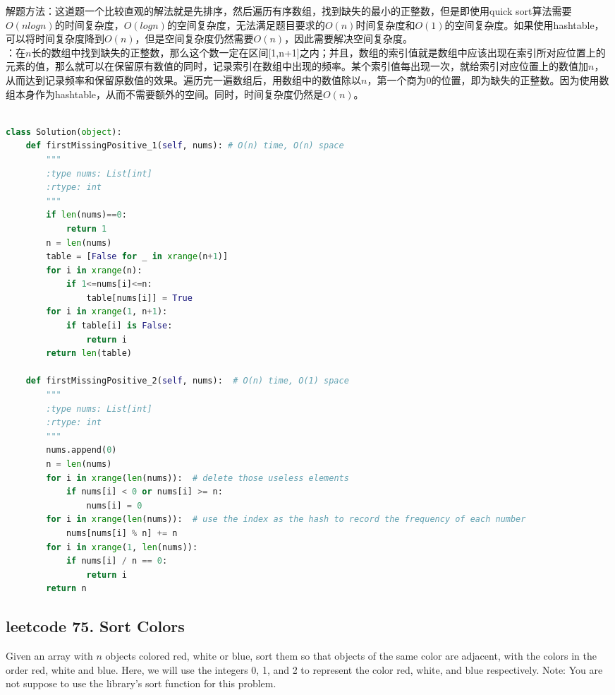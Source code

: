 \documentclass[a4paper,10pt]{article}
\begin{document}
\begin{CJK*}{UTF8}{gbsn}
\noindent 解题方法：这道题一个比较直观的解法就是先排序，然后遍历有序数组，找到缺失的最小的正整数，但是即使用quick sort算法需要$O(nlogn)$的时间复杂度，$O(logn)$的空间复杂度，无法满足题目要求的$O(n)$时间复杂度和$O(1)$的空间复杂度。如果使用hashtable，可以将时间复杂度降到$O(n)$，但是空间复杂度仍然需要$O(n)$，因此需要解决空间复杂度。\\

：在$n$长的数组中找到缺失的正整数，那么这个数一定在区间[1,n+1]之内；并且，数组的索引值就是数组中应该出现在索引所对应位置上的元素的值，那么就可以在保留原有数值的同时，记录索引在数组中出现的频率。某个索引值每出现一次，就给索引对应位置上的数值加$n$，从而达到记录频率和保留原数值的效果。遍历完一遍数组后，用数组中的数值除以$n$，第一个商为0的位置，即为缺失的正整数。因为使用数组本身作为hashtable，从而不需要额外的空间。同时，时间复杂度仍然是$O(n)$。
\end{CJK*}

\begin{lstlisting}[language=Python, caption=Problem41. First Missing Positive]

class Solution(object):
    def firstMissingPositive_1(self, nums): # O(n) time, O(n) space
        """
        :type nums: List[int]
        :rtype: int
        """
        if len(nums)==0:
            return 1
        n = len(nums)
        table = [False for _ in xrange(n+1)]
        for i in xrange(n):
            if 1<=nums[i]<=n:
                table[nums[i]] = True
        for i in xrange(1, n+1):
            if table[i] is False:
                return i
        return len(table)

    def firstMissingPositive_2(self, nums):  # O(n) time, O(1) space
        """
        :type nums: List[int]
        :rtype: int
        """
        nums.append(0)
        n = len(nums)
        for i in xrange(len(nums)):  # delete those useless elements
            if nums[i] < 0 or nums[i] >= n:
                nums[i] = 0
        for i in xrange(len(nums)):  # use the index as the hash to record the frequency of each number
            nums[nums[i] % n] += n
        for i in xrange(1, len(nums)):
            if nums[i] / n == 0:
                return i
        return n
\end{lstlisting}


\subsection{leetcode 75. Sort Colors}
Given an array with $n$ objects colored red, white or blue, sort them so that objects of the same color are adjacent, with the colors in the order red, white and blue. Here, we will use the integers 0, 1, and 2 to represent the color red, white, and blue respectively. Note: You are not suppose to use the library's sort function for this problem. \\
\end{document}
